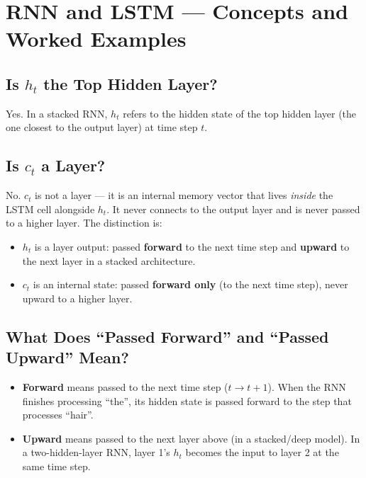 \section{RNN and LSTM --- Concepts and Worked Examples}

\subsection{Is $h_t$ the Top Hidden Layer?}

Yes. In a stacked RNN, $h_t$ refers to the hidden state of the top hidden layer
(the one closest to the output layer) at time step $t$.

\subsection{Is $c_t$ a Layer?}

No. $c_t$ is not a layer --- it is an internal memory vector that lives \emph{inside}
the LSTM cell alongside $h_t$. It never connects to the output layer and is never
passed to a higher layer. The distinction is:

\begin{itemize}
    \item $h_t$ is a layer output: passed \textbf{forward} to the next time step and
          \textbf{upward} to the next layer in a stacked architecture.
    \item $c_t$ is an internal state: passed \textbf{forward only} (to the next time step),
          never upward to a higher layer.
\end{itemize}

\subsection{What Does ``Passed Forward'' and ``Passed Upward'' Mean?}

\begin{itemize}
    \item \textbf{Forward} means passed to the next time step ($t \to t+1$).
          When the RNN finishes processing ``the'', its hidden state is passed forward
          to the step that processes ``hair''.
    \item \textbf{Upward} means passed to the next layer above (in a stacked/deep model).
          In a two-hidden-layer RNN, layer 1's $h_t$ becomes the input to layer 2 at
          the same time step.
\end{itemize}

